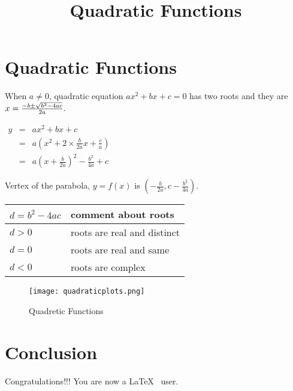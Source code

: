 \documentclass{article}
\title{Quadratic Functions}
\begin{document}
\maketitle

\section{Quadratic Functions}
When $a \ne 0$, quadratic equation $ax^2 + bx + c = 0$ has two roots and they are
$x = {-b \pm \sqrt{b^2-4ac} \over 2a}.$ 

$ \begin{array}{rcl}
y & = & a x^{2}+bx+c\\
  & = & a\left(x^{2}+2\times\frac{b}{2a}x+\frac{c}{a}\right)\\
  & = & a\left(x+\frac{b}{2a}\right)^2 - \frac{b^2}{4a} + c
\end{array} $ 

Vertex of the parabola, $y = f(x)$ is $\left(-\frac{b}{2a}, c - \frac{b^2}{4a}\right)$.

\begin{center}
\begin{tabular}{|l|l|}
\hline
 $d = b^2 - 4ac$ & comment about roots \\ 
 \hline
 $d>0$ & roots are real and distinct \\  
 \hline
 $d = 0$ & roots are real and same \\
 \hline
 $d<0$ & roots are complex \\
\hline
\end{tabular}
\end{center}

\begin{figure}[h!]
\centering
\texttt{[image: quadraticplots.png]}
\caption{Quadretic Functions}
\label{fig:quadretic}
\end{figure}

\section{Conclusion}
Congratulations!!! You are now a \LaTeX~ user.
\end{document}
